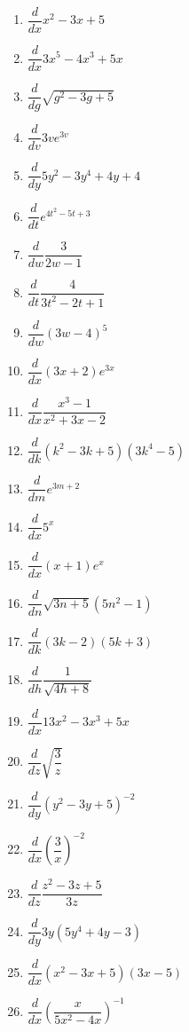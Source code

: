 \documentclass[handout,nooutcomes,noauthor,12pt]{ximera}
\begin{document}
	\begin{multicols}{2}
		\begin{enumerate}[label=\arabic*.]
			\item $\dfrac{d}{dx} x^2-3x+5$
			\item $ \dfrac{d}{dx} 3x^5-4x^3+5x $
			\item $ \dfrac{d}{dg} \sqrt{g^2-3g+5} $
			\item $ \dfrac{d}{dv} 3ve^{3v} $
			\item $ \dfrac{d}{dy} 5y^2-3y^4+4y+4 $
			\item $ \dfrac{d}{dt} e^{4t^2-5t+3} $
			\item $ \dfrac{d}{dw} \dfrac{3}{2w-1} $
			\item $ \dfrac{d}{dt} \dfrac{4}{3t^2-2t+1} $
			\item $ \dfrac{d}{dw} \left(3w-4\right)^5 $
			\item $ \dfrac{d}{dx} (3x+2)e^{3x} $
			\item $ \dfrac{d}{dx} \dfrac{x^3-1}{x^2+3x-2} $
			\item $ \dfrac{d}{dk} \left(k^2-3k+5\right)\left(3k^4-5\right) $
			\item $ \dfrac{d}{dm} e^{3m+2} $
			\item $ \dfrac{d}{dx} 5^x $
			\item $ \dfrac{d}{dx} (x+1)e^x $
			\item $ \dfrac{d}{dn} \sqrt{3n+5}\left(5n^2-1\right) $
			\item $ \dfrac{d}{dk} \left(3k-2\right)\left(5k+3\right) $
			\item $ \dfrac{d}{dh} \dfrac{1}{\sqrt{4h+8}} $
			\item $ \dfrac{d}{dx} 13x^2-3x^3+5x $
			\item $ \dfrac{d}{dz} \sqrt{\dfrac{3}{z}} $
			\item $ \dfrac{d}{dy} \left(y^2-3y+5\right)^{-2} $
			\item $ \dfrac{d}{dx} \left(\dfrac{3}{x}\right)^{-2} $
			\item $ \dfrac{d}{dz} \dfrac{z^2-3z+5}{3z} $
			\item $ \dfrac{d}{dy} 3y\left(5y^4+4y-3\right) $
			\item $ \dfrac{d}{dx} \left(x^2-3x+5\right) \left( 3x-5 \right) $
			\item $ \dfrac{d}{dx} \left( \dfrac{x}{5x^2-4x}\right)^{-1} $
		\end{enumerate}
	\end{multicols}
\end{document}
